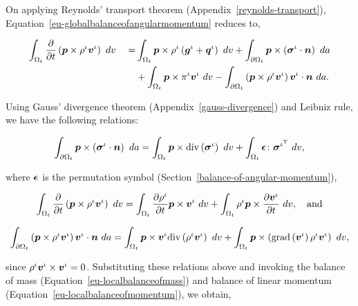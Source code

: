 On applying Reynolds' transport theorem
(Appendix~\ref{reynolds-transport}),
Equation~\ref{eu-globalbalanceofangularmomentum} reduces to,

\begin{equation*}
\begin{split}
\int_{\Omega_{t}} \frac{\partial}{\partial t}\left( \mbox{\boldmath$ p$} \times \rho^{\iota}
  \mbox{\boldmath$ v$}^{\iota}\right)\ dv \quad =
& \int_{\Omega_{t}} \mbox{\boldmath$ p$} \times \rho^{\iota} \left(\mbox{\boldmath$ g$}^{\iota} +
  \mbox{\boldmath$ q$}^{\iota}\right)\ dv
+ \int_{\partial \Omega_{t}}
  \mbox{\boldmath$ p$} \times \left(\mbox{\boldmath$\sigma$}^{\iota}\cdot\mbox{\boldmath$ n$}\right)\ da\\
& + \int_{\Omega_{t}} \mbox{\boldmath$ p$} \times 
  \pi^{\iota}\mbox{\boldmath$ v$}^{\iota}\ dv - \int_{\partial \Omega_{t}} \left(\mbox{\boldmath$ p$}
  \times \rho^{\iota} 
  \mbox{\boldmath$ v$}^{\iota}\right) \mbox{\boldmath$ v$}^{\iota} \cdot \mbox{\boldmath$ n$}\ da.
\end{split}
\end{equation*}

Using Gauss' divergence theorem (Appendix~\ref{gauss-divergence}) and
Leibniz rule, we have the following relations:

\begin{displaymath}
\int_{\partial \Omega_{t}}
  \bp \times \left(\Bsigma^{\iota}\cdot\bn\right)\ da =
\int_{\Omega_{t}}
  \bp \times \mathrm{div}\left(\Bsigma^{\iota}\right)\ dv
+\int_{\Omega_{t}} \Bepsilon\colon\Bsigma^{\iota^{\mathrm{T}}} \ dv,
\end{displaymath}

\noindent where $\mbox{\boldmath$\epsilon$}$ is the permutation symbol
(Section~\ref{balance-of-angular-momentum}),

\begin{displaymath}
\int_{\Omega_{t}}
\frac{\partial}{\partial t}\left( \bp \times \rho^{\iota}
\bv^{\iota}\right)\ dv =
\int_{\Omega_{t}} \frac{\partial \rho^{\iota}} {\partial t}
\bp \times \bv^{\iota}\ dv + \int_{\Omega_{t}} \rho^{\iota} \bp \times 
\frac{\partial \bv^{\iota}} {\partial t}\ dv,\quad\mathrm{and}
\end{displaymath}

\begin{displaymath}
\int_{\partial \Omega_{t}} \left(\bp
  \times \rho^{\iota} 
  \bv^{\iota}\right) \bv^{\iota} \cdot \bn\ da = 
\int_{\Omega_{t}}\bp \times \bv^{\iota} \mathrm{div}
\left(\rho^{\iota}\bv^{\iota}\right)\ dv + \int_{\Omega_{t}}\bp \times
\left(\mathrm{grad}\left(\bv^{\iota}\right)\rho^{\iota}\bv^{\iota}\right)\ dv,
\end{displaymath}

\noindent since $\rho^{\iota} \mbox{\boldmath$ v$}^{\iota}\times\mbox{\boldmath$ v$}^{\iota} =
0$. Substituting these relations above and invoking the balance of
mass (Equation~\ref{eu-localbalanceofmass}) and balance of linear
momentum (Equation~\ref{eu-localbalanceofmomentum}), we obtain,

